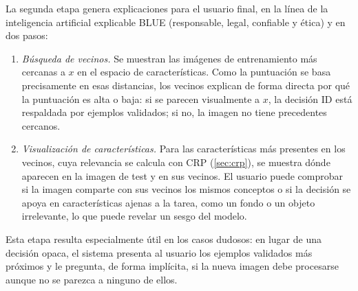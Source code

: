 La segunda etapa genera explicaciones para el usuario final, en la línea de la inteligencia
artificial explicable BLUE (responsable, legal, confiable y ética) y en dos pasos:
\begin{enumerate}
  \item \emph{Búsqueda de vecinos.} Se muestran las imágenes de entrenamiento más cercanas a
        $x$ en el espacio de características. Como la puntuación se basa precisamente en esas
        distancias, los vecinos explican de forma directa por qué la puntuación es alta o
        baja: si se parecen visualmente a $x$, la decisión ID está respaldada por ejemplos
        validados; si no, la imagen no tiene precedentes cercanos.
  \item \emph{Visualización de características.} Para las características más presentes en los vecinos,
        cuya relevancia se calcula con CRP (\cref{sec:crp}), se muestra dónde aparecen en la imagen de test y
        en sus vecinos. El usuario puede comprobar si la imagen comparte con sus vecinos los
        mismos conceptos o si la decisión se apoya en características ajenas a la tarea, como
        un fondo o un objeto irrelevante, lo que puede revelar un sesgo del modelo.
\end{enumerate}
Esta etapa resulta especialmente útil en los casos dudosos: en lugar de una decisión opaca,
el sistema presenta al usuario los ejemplos validados más próximos y le pregunta, de forma
implícita, si la nueva imagen debe procesarse aunque no se parezca a ninguno de ellos.

\endinput
